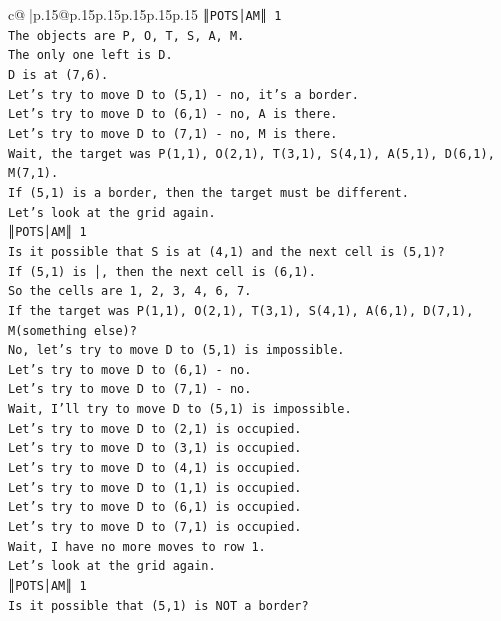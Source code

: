 \documentclass{article}
\begin{document}
{\begin{supertabular}{c@{$\;$}|p{.15\linewidth}@{}p{.15\linewidth}p{.15\linewidth}p{.15\linewidth}p{.15\linewidth}p{.15\linewidth}}
{{{\texttt{║POTS│AM║ 1} \\
\texttt{The objects are P, O, T, S, A, M.} \\
\texttt{The only one left is D.} \\
\texttt{D is at (7,6).} \\
\texttt{Let's try to move D to (5,1) {-} no, it's a border.} \\
\texttt{Let's try to move D to (6,1) {-} no, A is there.} \\
\texttt{Let's try to move D to (7,1) {-} no, M is there.} \\
\texttt{Wait, the target was P(1,1), O(2,1), T(3,1), S(4,1), A(5,1), D(6,1), M(7,1).} \\
\texttt{If (5,1) is a border, then the target must be different.} \\
\texttt{Let's look at the grid again.} \\
\texttt{║POTS│AM║ 1} \\
\texttt{Is it possible that S is at (4,1) and the next cell is (5,1)?} \\
\texttt{If (5,1) is │, then the next cell is (6,1).} \\
\texttt{So the cells are 1, 2, 3, 4, 6, 7.} \\
\texttt{If the target was P(1,1), O(2,1), T(3,1), S(4,1), A(6,1), D(7,1), M(something else)?} \\
\texttt{No, let's try to move D to (5,1) is impossible.} \\
\texttt{Let's try to move D to (6,1) {-} no.} \\
\texttt{Let's try to move D to (7,1) {-} no.} \\
\texttt{Wait, I'll try to move D to (5,1) is impossible.} \\
\texttt{Let's try to move D to (2,1) is occupied.} \\
\texttt{Let's try to move D to (3,1) is occupied.} \\
\texttt{Let's try to move D to (4,1) is occupied.} \\
\texttt{Let's try to move D to (1,1) is occupied.} \\
\texttt{Let's try to move D to (6,1) is occupied.} \\
\texttt{Let's try to move D to (7,1) is occupied.} \\
\texttt{Wait, I have no more moves to row 1.} \\
\texttt{Let's look at the grid again.} \\
\texttt{║POTS│AM║ 1} \\
\texttt{Is it possible that (5,1) is NOT a border?} \\
}}}
\end{supertabular}}
\end{document}
